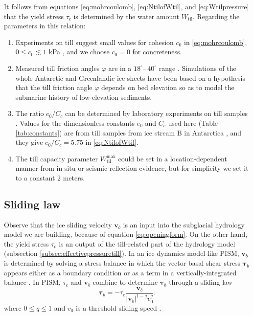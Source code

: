 \documentclass[gmd]{copernicus}   %
\newcommand{\text}{\textrm}
\newcommand{\Wtil}{W_{\text{til}}}
\newcommand{\Wtilmax}{W_{\text{til}}^{\text{max}}}
\begin{document}
It follows from equations \eqref{eq:mohrcoulomb}, \eqref{eq:NtilofWtil}, and \eqref{eq:Wtilpressure} that the yield stress $\tau_c$ is determined by the water amount $\Wtil$.  Regarding the parameters in this relation:
\renewcommand{\labelenumi}{(\emph{\roman{enumi}})}
\begin{enumerate}
\item Experiments on till suggest small values for cohesion $c_0$ in \eqref{eq:mohrcoulomb}, $0 \le c_0 \lesssim 1$ kPa \citep{Tulaczyketal2000}, and we choose $c_0=0$ for concreteness.
\item Measured till friction angles $\varphi$ are in a $18^\circ$--\,$40^\circ$ range \citep{CuffeyPaterson}.  Simulations of the whole Antarctic \citep{Martinetal2011} and Greenlandic \citep{AschwandenAdalgeirsdottirKhroulev} ice sheets have been based on a hypothesis that the till friction angle $\varphi$ depends on bed elevation so as to model the submarine history of low-elevation sediments.
\item The ratio $e_0/C_c$ can be determined by laboratory experiments on till samples \citep[e.g.][]{Hookeetal1997,Tulaczyketal2000}.  Values for the dimensionless constants $e_0$ and $C_c$ used here (Table \ref{tab:constants}) are from till samples from ice stream B in Antarctica \citep{Tulaczyketal2000}, and they give $e_0/C_c=5.75$ in \eqref{eq:NtilofWtil}.
\item The till capacity parameter $\Wtilmax$ could be set in a location-dependent manner from in situ \citep{Tulaczyketal2000} or seismic reflection \citep{Rooneyetal1987} evidence, but for simplicity we set it to a constant $2$ meters.
\end{enumerate}

\subsection{Sliding law}  Observe that the ice sliding velocity $\mathbf{v}_b$ is an input into the subglacial hydrology model we are building, because of equation \eqref{eq:openingform}.  On the other hand, the yield stress $\tau_c$ is an output of the till-related part of the hydrology model (subsection \ref{subsec:effectivepressuretill}).  In an ice dynamics model like PISM, $\mathbf{v}_b$ is determined by solving a stress balance in which the vector basal shear stress $\boldsymbol\tau_b$ appears either as a boundary condition \citep{SchoofCoulombBlatter} or as a term in a vertically-integrated balance \citep{SchoofStream,BBssasliding}.  In PISM, $\tau_c$ and $\mathbf{v}_b$ combine to determine $\boldsymbol\tau_b$ through a sliding law
\begin{equation}
\boldsymbol\tau_b = - \tau_c \frac{\mathbf{v}_b}{|\mathbf{v}_b|^{1-q} v_0^q}. \label{eq:pseudobasalstress}
\end{equation}
where $0\le q \le 1$ and $v_0$ is a threshold sliding speed \citep{AschwandenAdalgeirsdottirKhroulev}.
\end{document}
